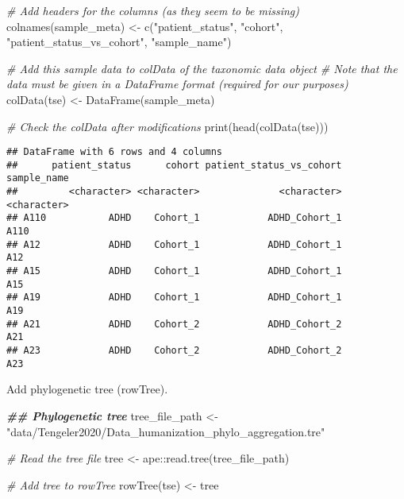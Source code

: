 \documentclass[
  oneside]{book}
\newenvironment{Shaded}{\begin{snugshade}}{\end{snugshade}}
\newcommand{\CommentTok}[1]{\textcolor[rgb]{0.56,0.35,0.01}{\textit{#1}}}
\newcommand{\DocumentationTok}[1]{\textcolor[rgb]{0.56,0.35,0.01}{\textbf{\textit{#1}}}}
\newcommand{\FunctionTok}[1]{\textcolor[rgb]{0.00,0.00,0.00}{#1}}
\newcommand{\NormalTok}[1]{#1}
\newcommand{\OtherTok}[1]{\textcolor[rgb]{0.56,0.35,0.01}{#1}}
\newcommand{\SpecialCharTok}[1]{\textcolor[rgb]{0.00,0.00,0.00}{#1}}
\newcommand{\StringTok}[1]{\textcolor[rgb]{0.31,0.60,0.02}{#1}}
\begin{document}
\begin{Shaded}
\begin{Highlighting}[]
\CommentTok{\# Add headers for the columns (as they seem to be missing)}
\FunctionTok{colnames}\NormalTok{(sample\_meta) }\OtherTok{\textless{}{-}} \FunctionTok{c}\NormalTok{(}\StringTok{"patient\_status"}\NormalTok{, }\StringTok{"cohort"}\NormalTok{,}
                           \StringTok{"patient\_status\_vs\_cohort"}\NormalTok{, }\StringTok{"sample\_name"}\NormalTok{)}

\CommentTok{\# Add this sample data to colData of the taxonomic data object}
\CommentTok{\# Note that the data must be given in a DataFrame format (required for our purposes)}
\FunctionTok{colData}\NormalTok{(tse) }\OtherTok{\textless{}{-}} \FunctionTok{DataFrame}\NormalTok{(sample\_meta)}

\CommentTok{\# Check the colData after modifications}
\FunctionTok{print}\NormalTok{(}\FunctionTok{head}\NormalTok{(}\FunctionTok{colData}\NormalTok{(tse)))}
\end{Highlighting}
\end{Shaded}

\begin{verbatim}
## DataFrame with 6 rows and 4 columns
##      patient_status      cohort patient_status_vs_cohort sample_name
##         <character> <character>              <character> <character>
## A110           ADHD    Cohort_1            ADHD_Cohort_1        A110
## A12            ADHD    Cohort_1            ADHD_Cohort_1         A12
## A15            ADHD    Cohort_1            ADHD_Cohort_1         A15
## A19            ADHD    Cohort_1            ADHD_Cohort_1         A19
## A21            ADHD    Cohort_2            ADHD_Cohort_2         A21
## A23            ADHD    Cohort_2            ADHD_Cohort_2         A23
\end{verbatim}

Add phylogenetic tree (rowTree).

\begin{Shaded}
\begin{Highlighting}[]
\DocumentationTok{\#\# Phylogenetic tree}
\NormalTok{tree\_file\_path }\OtherTok{\textless{}{-}} \StringTok{"data/Tengeler2020/Data\_humanization\_phylo\_aggregation.tre"}

\CommentTok{\# Read the tree file}
\NormalTok{tree }\OtherTok{\textless{}{-}}\NormalTok{ ape}\SpecialCharTok{::}\FunctionTok{read.tree}\NormalTok{(tree\_file\_path)}

\CommentTok{\# Add tree to rowTree}
\FunctionTok{rowTree}\NormalTok{(tse) }\OtherTok{\textless{}{-}}\NormalTok{ tree}
\end{Highlighting}
\end{Shaded}
\end{document}
